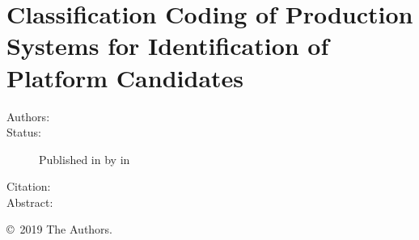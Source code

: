 \chapter[Classification Coding of Production Systems]{Classification Coding of Production Systems for Identification of Platform Candidates}\label{paper:clsfCoding}
\setcounter{page}{95}

\begin{description}
  \item[Authors:] 
  \item[Status:] Published in \citeyear{SorensenClsfCoding} by  in %
  \item[Citation:] 
  \item[Abstract:]  
\end{description}

\vfill
\noindent\copyright~2019 The Authors.

% 